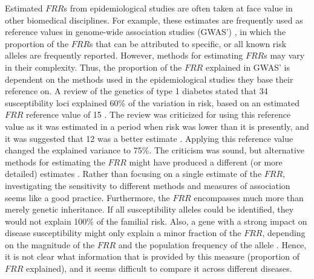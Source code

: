 \documentclass{bmcart}
\begin{document}
Estimated $FRR$s from epidemiological studies are often taken at face value in other biomedical disciplines. For example, these estimates are frequently used as reference values in genome-wide association studies (GWAS') \cite{houlston2008meta,houlston1996genetics,cox2007common,witte2014contribution}, in which the proportion of the $FRR$s that can be attributed to specific, or all known risk alleles are frequently reported. However, methods for estimating $FRR$s may vary in their complexity. Thus, the proportion of the $FRR$ explained in GWAS' is dependent on the methods used in the epidemiological studies they base their reference on. A review of the genetics of type 1 diabetes stated that 34 susceptibility loci explained 60\% of the variation in risk, based on an estimated $FRR$ reference value of 15 \cite{polychronakos2011understanding}. The review was criticized for using this reference value as it was estimated in a period when risk was lower than it is presently, and it was suggested that 12 was a better estimate \cite{hemminki2012familial}. Applying this reference value changed the explained variance to 75\%. The criticism was sound, but alternative methods for estimating the $FRR$ might have produced a different (or more detailed) estimates \cite{moger2011hierarchical,valberg2014hierarchical,ABG}. Rather than focusing on a single estimate of the $FRR$, investigating the sensitivity to different methods and measures of association seems like a good practice. Furthermore, the $FRR$ encompasses much more than merely genetic inheritance. If all susceptibility alleles could be identified, they would not explain 100\% of the familial risk. Also, a gene with a strong impact on disease susceptibility might only explain a minor fraction of the $FRR$, depending on the magnitude of the $FRR$ and the population frequency of the allele \cite{rybicki2000relationship}. Hence, it is not clear what information that is provided by this measure (proportion of $FRR$ explained), and it seems difficult to compare it across different diseases.
\end{document}
